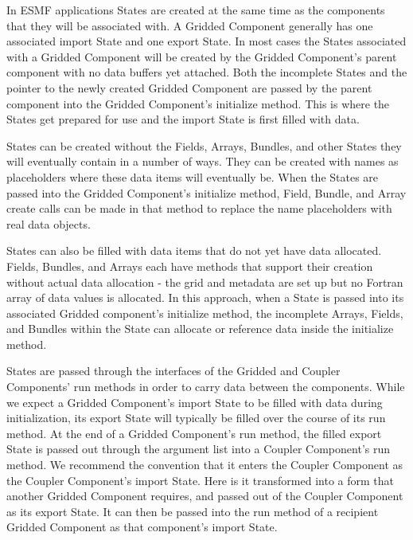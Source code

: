 %


In ESMF applications States are created at the same 
time as the components that they will be associated with.  
A Gridded Component generally has one associated import 
State and one export State.  In most cases the States 
associated with a Gridded Component will be created by 
the Gridded Component's parent component with no data 
buffers yet attached.  Both the incomplete States and the 
pointer to the newly created Gridded Component are passed
by the parent component into the Gridded Component's initialize 
method.  This is where the States get prepared for use 
and the import State is first filled with data.

States can be created without the Fields, Arrays, Bundles,
and other States they will eventually contain in a number 
of ways.  They can be created with names as placeholders where 
these data items will eventually be.  When the States are passed 
into the Gridded Component's initialize method, Field,
Bundle, and Array create calls can be made in that method
to replace the name placeholders with real data objects.

States can also be filled with data items that do not yet 
have data allocated.  Fields, Bundles, and Arrays each have 
methods that support their creation without actual data 
allocation - the grid and metadata are set up but no
Fortran array of data values is allocated.  In this approach, 
when a State is passed into its associated Gridded component's 
initialize method, the incomplete Arrays, Fields, and 
Bundles within the State can allocate or reference data 
inside the initialize method.

States are passed through the interfaces of the Gridded 
and Coupler Components' run methods in order to carry data 
between the components.  While we expect
a Gridded Component's import State to be filled with data 
during initialization, its export State will typically be
filled over the course of its run method.  At the end of
a Gridded Component's run method, the filled export State 
is passed out through the argument list into a Coupler 
Component's run method.  We recommend the convention that 
it enters the Coupler Component as the Coupler Component's
import State.  Here is it transformed into a form
that another Gridded Component requires, and passed out
of the Coupler Component as its export State.  It can then
be passed into the run method of a recipient Gridded Component
as that component's import State.

